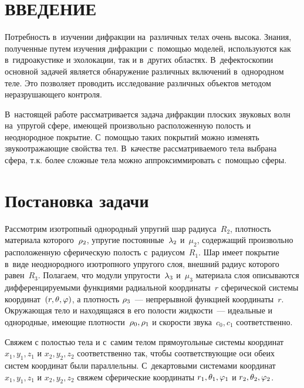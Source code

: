 

\renewcommand{\bibname}{СПИСОК ИСПОЛЬЗОВАННЫХ ИСТОЧНИКОВ}
\renewcommand\refname{СПИСОК ИСПОЛЬЗОВАННЫХ ИСТОЧНИКОВ}

%

\setcounter{page}{2}
\thispagestyle {empty}
\renewcommand{\contentsname}{\centering СОДЕРЖАНИЕ}
\tableofcontents

\newpage
\section*{ВВЕДЕНИЕ}
Потребность в~изучении дифракции на~различных телах очень высока. Знания, полученные путем изучения дифракции с~помощью моделей, используются как в~гидроакустике и эхолокации, так и в~других областях. В~дефектоскопии основной задачей является обнаружение различных включений в~однородном теле. Это позволяет проводить исследование различных объектов методом неразрушающего контроля.

В~настоящей работе рассматривается задача дифракции плоских звуковых волн на~упругой сфере, имеющей произвольно расположенную полость и неоднородное покрытие. С~помощью таких покрытий можно изменять звукоотражающие свойства тел. В~качестве рассматриваемого тела выбрана сфера, т.к. более сложные тела можно аппроксиммировать с~помощью сферы. 


\newpage
\section{Постановка задачи} Рассмотрим изотропный однородный упругий шар радиуса~$R_2$, плотность материала которого~$\rho_2$, упругие постоянные~$\lambda_2$ и~$\mu_2$, содержащий произвольно расположенную сферическую полость с~радиусом~$R_1$. Шар имеет покрытие в~виде неоднородного изотропного упругого слоя, внешний радиус которого равен~$R_3$. Полагаем, что модули упругости~$\lambda_3$ и~$\mu_3$ материала слоя описываются дифференцируемыми функциями радиальной координаты~$r$ сферической системы координат~$(r, \theta, \varphi)$, а плотность $\rho_3$~--- непрерывной функцией координаты~$r$.  Окружающая тело и находящаяся в его полости жидкости~--- идеальные и однородные, имеющие плотности~$\rho_0, \rho_1$ и скорости звука~$c_0, c_1$ соответственно. 

Свяжем с полостью тела и с~самим телом прямоугольные системы координат $x_1, y_1, z_1$ и $x_2, y_2, z_2$ соответственно так, чтобы соответствующие оси обеих систем координат были параллельны. С~декартовыми системами координат $x_1, y_1, z_1$ и $x_2, y_2, z_2$ свяжем сферические координаты $r_1, \theta_1, \varphi_1$ и $r_2, \theta_2, \varphi_2$.

